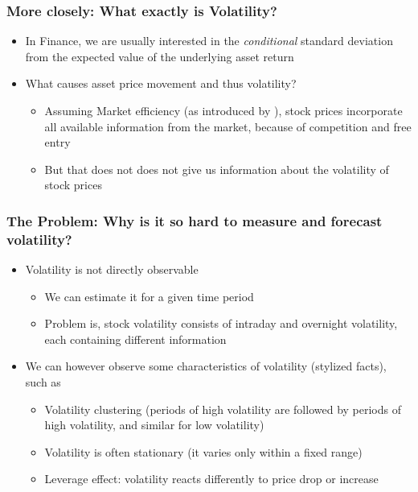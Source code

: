 \documentclass[aspectratio=169]{beamer}
\begin{document}
\begin{frame}
\frametitle{More closely: What exactly is Volatility?}
	\begin{itemize}
	\item In Finance, we are usually interested in the \textit{conditional} standard deviation from the expected value of the underlying asset return \parencite{tsay2005}
	\item What causes asset price movement and thus volatility?
		\begin{itemize}
		\item Assuming Market efficiency (as introduced by \citeauthor{fama1970}), stock prices incorporate all available information from the market, because of competition and free entry 
		\item But that does not does not give us information about the volatility of stock prices
		\end{itemize}
	\end{itemize}
\end{frame}

\begin{frame}
\frametitle{The Problem: Why is it so hard to measure and forecast volatility?}
	\begin{itemize}
	\item Volatility is not directly observable
		\begin{itemize}
		\item We can estimate it for a given time period 
		\item Problem is, stock volatility consists of intraday and overnight volatility, each containing different information
		\end{itemize}
	\item We can however observe some characteristics of volatility (stylized facts), such as
		\begin{itemize}
		\item Volatility clustering (periods of high volatility are followed by periods of high volatility, and similar for low volatility)
		\item Volatility is often stationary (it varies only within a fixed range)
		\item Leverage effect: volatility reacts differently to price drop or increase
		\end{itemize}
	\end{itemize}
\end{frame}
\end{document}
